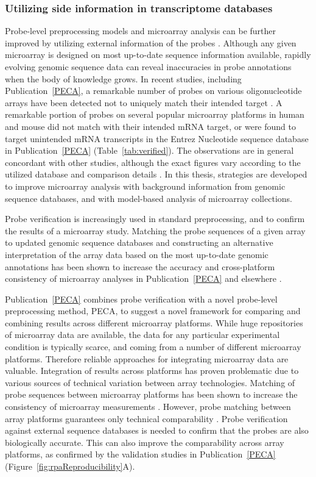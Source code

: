 \subsubsection{Utilizing side information in transcriptome databases}

Probe-level preprocessing models and microarray analysis can be
further improved by utilizing external information of the probes
\citep{Eisenstein06, Hwang04, Katz06}.  Although any given microarray
is designed on most up-to-date sequence information available, rapidly
evolving genomic sequence data can reveal inaccuracies in probe
annotations when the body of knowledge grows.  In recent studies,
including Publication~\ref{PECA}, a remarkable number of probes on
various oligonucleotide arrays have been detected not to uniquely
match their intended target \citep{Hwang04, Mecham04a}.  A remarkable
portion of probes on several popular microarray platforms in human and
mouse did not match with their intended mRNA target, or were found to
target unintended mRNA transcripts in the Entrez Nucleotide
\citep{Wheeler05} sequence database in Publication~\ref{PECA}
(Table~\ref{tab:verified}). The observations are in general concordant
with other studies, although the exact figures vary according to the
utilized database and comparison details \citep{Gautier04b,
  Mecham04b}. In this thesis, strategies are developed to improve
microarray analysis with background information from genomic sequence
databases, and with model-based analysis of microarray collections.

Probe verification is increasingly used in standard preprocessing, and
to confirm the results of a microarray study.  Matching the probe
sequences of a given array to updated genomic sequence databases and
constructing an alternative interpretation of the array data based on
the most up-to-date genomic annotations has been shown to increase the
accuracy and cross-platform consistency of microarray analyses in
Publication~\ref{PECA} and elsewhere \citep{Dai05, Gautier04b}.

Publication~\ref{PECA} combines probe verification with a novel
probe-level preprocessing method, PECA, to suggest a novel framework
for comparing and combining results across different microarray
platforms. While huge repositories of microarray data are available,
the data for any particular experimental condition is typically
scarce, and coming from a number of different microarray
platforms. Therefore reliable approaches for integrating microarray
data are valuable. Integration of results across platforms has proven
problematic due to various sources of technical variation between
array technologies.  Matching of probe sequences between microarray
platforms has been shown to increase the consistency of microarray
measurements \citep{Hwang04,Mecham04b}. However, probe matching
between array platforms guarantees only technical comparability
\citep{Irizarry05}.  Probe verification against external sequence
databases is needed to confirm that the probes are also biologically
accurate. This can also improve the comparability across array
platforms, as confirmed by the validation studies in
Publication~\ref{PECA} (Figure~\ref{fig:rpaReproducibility}A).

